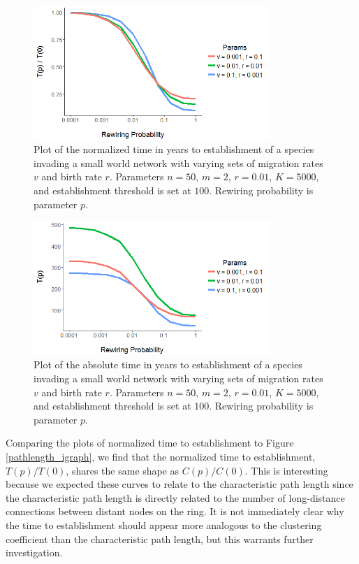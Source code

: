 \documentclass[12pt, openany]{book}
\theoremstyle{definition}
\theoremstyle{remark}
\numberwithin{equation}{chapter}
\numberwithin{figure}{chapter}
\begin{document}
\begin{figure}[t!]
\begin{center}
       \includegraphics[width=0.8\textwidth]{smallworld_allnorm2.png}
       \caption{Plot of the normalized time in years to establishment of a species invading a small world network with varying sets of migration rates $v$ and birth rate $r$. Parameters $n = 50$, $m = 2$, $r = 0.01$, $K = 5000$, and establishment threshold is set at $100$. Rewiring probability is parameter $p$.\label{smallworld_allnorm}}
\end{center}
\end{figure}  

\begin{figure}[t!]
\begin{center}
       \includegraphics[width=0.8\textwidth]{smallworld_allabs2.png}
       \caption{Plot of the absolute time in years to establishment of a species invading a small world network with varying sets of migration rates $v$ and birth rate $r$. Parameters $n = 50$, $m = 2$, $r = 0.01$, $K = 5000$, and establishment threshold is set at $100$. Rewiring probability is parameter $p$.\label{smallworld_allabs}}
\end{center}
\end{figure}  

Comparing the plots of normalized time to establishment to Figure \ref{pathlength_igraph}, we find that the normalized time to establishment, $T(p)/T(0)$, shares the same shape as $C(p)/C(0)$. This is interesting because we expected these curves to relate to the characteristic path length since the characteristic path length is directly related to the number of long-distance connections between distant nodes on the ring. It is not immediately clear why the time to establishment should appear more analogous to the clustering coefficient than the characteristic path length, but this warrants further investigation.
\end{document}
